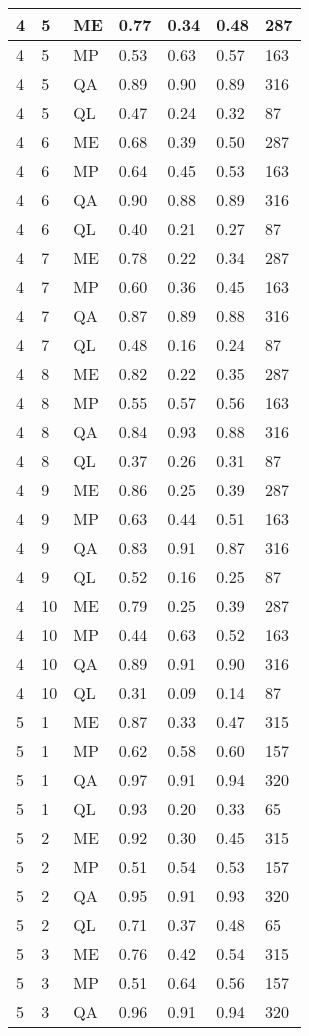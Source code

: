 \begin{table}[!ht]
\begin{tabularx}{300pt}{|X|X|X|X|X|X|X|}
\hline
4&5&ME&0.77&0.34&0.48&287\\
\hline
4&5&MP&0.53&0.63&0.57&163\\
\hline
4&5&QA&0.89&0.90&0.89&316\\
\hline
4&5&QL&0.47&0.24&0.32&87\\
\hline
4&6&ME&0.68&0.39&0.50&287\\
\hline
4&6&MP&0.64&0.45&0.53&163\\
\hline
4&6&QA&0.90&0.88&0.89&316\\
\hline
4&6&QL&0.40&0.21&0.27&87\\
\hline
4&7&ME&0.78&0.22&0.34&287\\
\hline
4&7&MP&0.60&0.36&0.45&163\\
\hline
4&7&QA&0.87&0.89&0.88&316\\
\hline
4&7&QL&0.48&0.16&0.24&87\\
\hline
4&8&ME&0.82&0.22&0.35&287\\
\hline
4&8&MP&0.55&0.57&0.56&163\\
\hline
4&8&QA&0.84&0.93&0.88&316\\
\hline
4&8&QL&0.37&0.26&0.31&87\\
\hline
4&9&ME&0.86&0.25&0.39&287\\
\hline
4&9&MP&0.63&0.44&0.51&163\\
\hline
4&9&QA&0.83&0.91&0.87&316\\
\hline
4&9&QL&0.52&0.16&0.25&87\\
\hline
4&10&ME&0.79&0.25&0.39&287\\
\hline
4&10&MP&0.44&0.63&0.52&163\\
\hline
4&10&QA&0.89&0.91&0.90&316\\
\hline
4&10&QL&0.31&0.09&0.14&87\\
\hline
5&1&ME&0.87&0.33&0.47&315\\
\hline
5&1&MP&0.62&0.58&0.60&157\\
\hline
5&1&QA&0.97&0.91&0.94&320\\
\hline
5&1&QL&0.93&0.20&0.33&65\\
\hline
5&2&ME&0.92&0.30&0.45&315\\
\hline
5&2&MP&0.51&0.54&0.53&157\\
\hline
5&2&QA&0.95&0.91&0.93&320\\
\hline
5&2&QL&0.71&0.37&0.48&65\\
\hline
5&3&ME&0.76&0.42&0.54&315\\
\hline
5&3&MP&0.51&0.64&0.56&157\\
\hline
5&3&QA&0.96&0.91&0.94&320\\

\end{tabularx}
\end{table}
